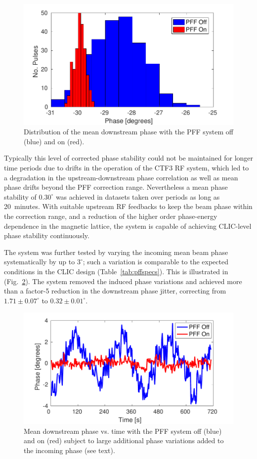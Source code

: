 \documentclass[%
 reprint,
 superscriptaddress,
 amsmath,
 amssymb,
 prl,
]{revtex4-1}
\begin{document}
\begin{figure}
	\includegraphics[width=\columnwidth]{figs/meanJit}
	\caption{\label{fig:meanJit}Distribution of the mean downstream phase with 
		the 
		PFF system off (blue) and on (red).}
\end{figure}

Typically this level of corrected phase stability could not be maintained for 
longer time periods due to drifts in the operation of the CTF3 RF system, which 
led to  a degradation in the upstream-downstream phase correlation as well as 
mean phase drifts beyond the PFF correction range. Nevertheless a mean phase 
stability of \(0.30^\circ\) was achieved in datasets taken over periods as long 
as 20~minutes. With suitable upstream RF feedbacks to keep the beam phase 
within the correction range, and a reduction of the higher order phase-energy 
dependence in the magnetic lattice, the system is capable of achieving 
CLIC-level phase stability continuously.

The system was further tested by varying the incoming mean 
beam phase systematically by up to \(3^\circ\); such a variation is comparable 
to the expected conditions in the CLIC design (Table~\ref{tab:pffspecs}). 
This is illustrated in (Fig.~\ref{fig:wiggle}). The system removed the induced 
phase variations and achieved more than a factor-5 reduction in the downstream 
phase jitter, correcting from \(1.71\pm0.07^\circ\) to \(0.32\pm0.01^\circ\). 

\begin{figure}
	\includegraphics[width=\columnwidth]{figs/wiggle}
	\caption{\label{fig:wiggle}Mean downstream phase vs. time with the PFF 
	system off (blue) and on (red) subject to large additional phase variations 
	added to the incoming phase (see text).}
\end{figure}
\end{document}
